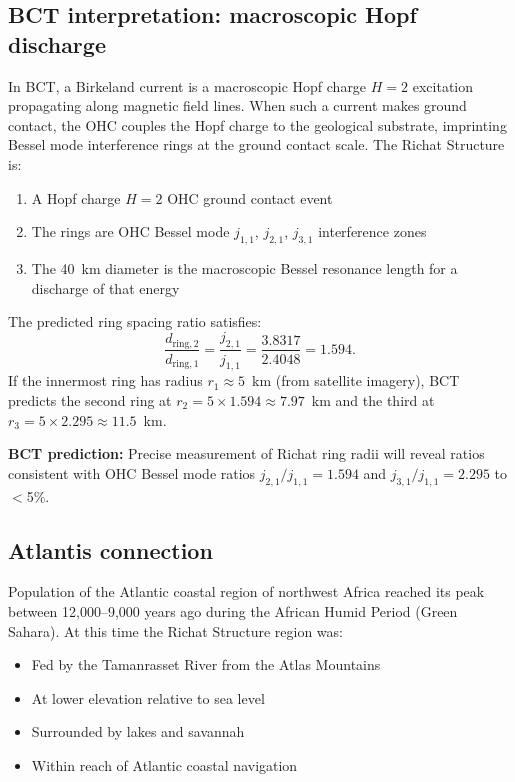 \documentclass[12pt,twocolumn]{article}
\begin{document}
\subsection{BCT interpretation: macroscopic Hopf discharge}

In BCT, a Birkeland current is a macroscopic Hopf charge
$H=2$ excitation propagating along magnetic field lines.
When such a current makes ground contact, the OHC couples
the Hopf charge to the geological substrate, imprinting
Bessel mode interference rings at the ground contact scale.
The Richat Structure is:

\begin{enumerate}
\item A Hopf charge $H=2$ OHC ground contact event
\item The rings are OHC Bessel mode $j_{1,1}$, $j_{2,1}$,
$j_{3,1}$ interference zones
\item The 40~km diameter is the macroscopic Bessel resonance
length for a discharge of that energy
\end{enumerate}

The predicted ring spacing ratio satisfies:
\begin{equation}
\frac{d_\mathrm{ring,2}}{d_\mathrm{ring,1}}=
\frac{j_{2,1}}{j_{1,1}}=\frac{3.8317}{2.4048}=1.594.
\end{equation}
If the innermost ring has radius $r_1\approx5$~km (from
satellite imagery), BCT predicts the second ring at
$r_2=5\times1.594\approx7.97$~km and the third at
$r_3=5\times2.295\approx11.5$~km.

\textbf{BCT prediction:} Precise measurement of Richat
ring radii will reveal ratios consistent with OHC Bessel
mode ratios $j_{2,1}/j_{1,1}=1.594$ and
$j_{3,1}/j_{1,1}=2.295$ to $<$5\%.

\subsection{Atlantis connection}

Population of the Atlantic coastal region of northwest
Africa reached its peak between 12,000--9,000 years ago
during the African Humid Period (Green Sahara). At this
time the Richat Structure region was:
\begin{itemize}
\item Fed by the Tamanrasset River from the Atlas Mountains
\item At lower elevation relative to sea level
\item Surrounded by lakes and savannah
\item Within reach of Atlantic coastal navigation
\end{itemize}
\end{document}
